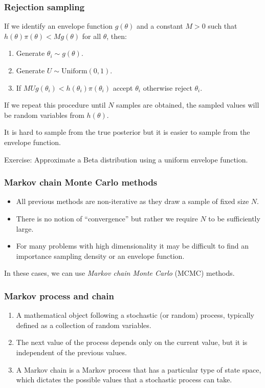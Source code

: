 \documentclass{beamer}
\newcommand{\1}{\ensuremath{\mathbf{1}}}
\begin{document}
\begin{frame}\frametitle{Rejection sampling}
	If we identify an envelope function $g(\theta)$ and a constant $M > 0$ such that $h(\theta)\pi(\theta) < Mg(\theta)$ for all $\theta$, then:
	\begin{enumerate}
		\item Generate $\theta_i \sim g(\theta)$.
		\item Generate $U \sim \text{Uniform}(0, 1)$.
		\item If $MUg(\theta_i) < h(\theta_i)\pi(\theta_i)$ accept $\theta_i$ otherwise reject $\theta_i$.
	\end{enumerate}
	If we repeat this procedure until $N$ samples are obtained, the sampled values will be random variables from $h(\theta)$.
	\begin{block}{}
		It is hard to sample from the true posterior but it is easier to sample from the envelope function.
	\end{block}
	Exercise: Approximate a Beta distribution using a uniform envelope function.
\end{frame}
%
%
%
\begin{frame}\frametitle{Markov chain Monte Carlo methods}
	\begin{itemize}
		\item All previous methods are non-iterative as they draw a sample of fixed size $N$.
		\item There is no notion of ``convergence'' but rather we require $N$ to be sufficiently large.
		\item For many problems with high dimensionality it may be difficult to find an importance sampling density or an envelope function.
	\end{itemize}
	In these cases, we can use \emph{Markov chain Monte Carlo} (MCMC) methods.
\end{frame}
%
%
%
\begin{frame}\frametitle{Markov process and chain}
	\begin{enumerate}
		\item A mathematical object following a stochastic (or random) process, typically defined as a collection of random variables.
		\item The next value of the process depends only on the current value, but it is independent of the previous values.
		\item A Markov chain is a Markov process that has a particular type of state space, which dictates the possible values that a stochastic process can take.
	\end{enumerate}
\end{frame}
\end{document}
